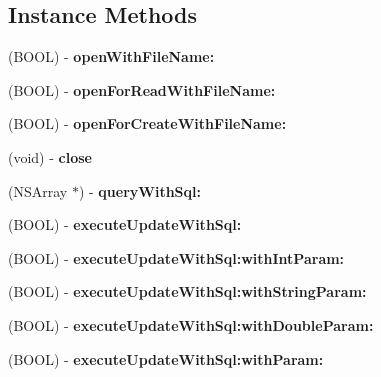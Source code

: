 \subsection*{Instance Methods}
\begin{DoxyCompactItemize}
\item 
\mbox{\label{interface_n_f_l_o_g_sqlite_ab1dcb5309f55e038b101ce2037240091}} 
(B\+O\+OL) -\/ {\bfseries open\+With\+File\+Name\+:}
\item 
\mbox{\label{interface_n_f_l_o_g_sqlite_a30e962e6a3ee86dbb3d64e07991fc08b}} 
(B\+O\+OL) -\/ {\bfseries open\+For\+Read\+With\+File\+Name\+:}
\item 
\mbox{\label{interface_n_f_l_o_g_sqlite_a16af0ec78bdb2f90d379ad206c0b7d7c}} 
(B\+O\+OL) -\/ {\bfseries open\+For\+Create\+With\+File\+Name\+:}
\item 
\mbox{\label{interface_n_f_l_o_g_sqlite_aac13ab1c1c0b79730cd884068e147161}} 
(void) -\/ {\bfseries close}
\item 
\mbox{\label{interface_n_f_l_o_g_sqlite_a2829a0f007dede4527f7fe49b8dac075}} 
(N\+S\+Array $\ast$) -\/ {\bfseries query\+With\+Sql\+:}
\item 
\mbox{\label{interface_n_f_l_o_g_sqlite_aeac0b3f877c792581cce970db170632a}} 
(B\+O\+OL) -\/ {\bfseries execute\+Update\+With\+Sql\+:}
\item 
\mbox{\label{interface_n_f_l_o_g_sqlite_ac5e12455af3f42f04c5fd20c63ac234c}} 
(B\+O\+OL) -\/ {\bfseries execute\+Update\+With\+Sql\+:with\+Int\+Param\+:}
\item 
\mbox{\label{interface_n_f_l_o_g_sqlite_a7c2a7ec5d695e83edd89100a5bd9eeca}} 
(B\+O\+OL) -\/ {\bfseries execute\+Update\+With\+Sql\+:with\+String\+Param\+:}
\item 
\mbox{\label{interface_n_f_l_o_g_sqlite_ad7e2365bcb075b28a4b85db1a7209e1d}} 
(B\+O\+OL) -\/ {\bfseries execute\+Update\+With\+Sql\+:with\+Double\+Param\+:}
\item 
\mbox{\label{interface_n_f_l_o_g_sqlite_a8e85e2a36f1a207e2dc0265f388c7834}} 
(B\+O\+OL) -\/ {\bfseries execute\+Update\+With\+Sql\+:with\+Param\+:}
\end{DoxyCompactItemize}


